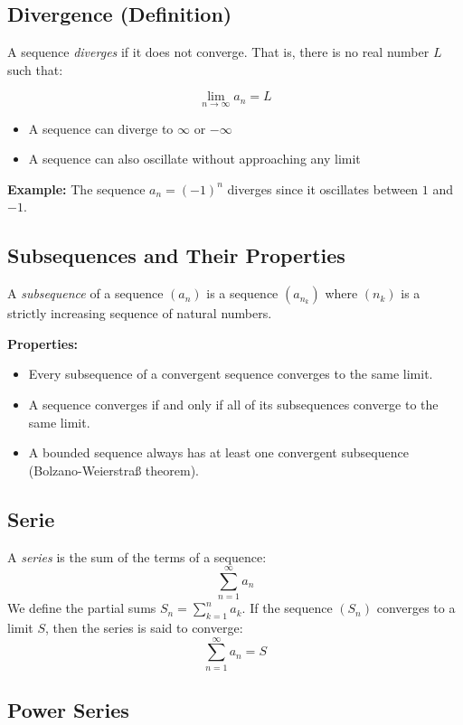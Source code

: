 \subsection{Divergence (Definition)}

A sequence \emph{diverges} if it does not converge. That is, there is no real number \(L\) such that:

\[
\lim_{n \to \infty} a_n = L
\]

\begin{itemize}[label=\(-\)]
\item A sequence can diverge to \(\infty\) or \(-\infty\)
\item A sequence can also oscillate without approaching any limit
\end{itemize}

\textbf{Example:} The sequence \(a_n = (-1)^n\) diverges since it oscillates between \(1\) and \(-1\).


\subsection{Subsequences and Their Properties}

A \emph{subsequence} of a sequence \((a_n)\) is a sequence \((a_{n_k})\) where \((n_k)\) is a strictly increasing sequence of natural numbers.

\textbf{Properties:}
\begin{itemize}[label=\(-\)]
\item Every subsequence of a convergent sequence converges to the same limit.
\item A sequence converges if and only if all of its subsequences converge to the same limit.
\item A bounded sequence always has at least one convergent subsequence (Bolzano-Weierstraß theorem).
\end{itemize}

\subsection{Serie}

A \emph{series} is the sum of the terms of a sequence:
\[
\sum_{n=1}^{\infty} a_n
\]
We define the partial sums \(S_n = \sum_{k=1}^n a_k\). If the sequence \((S_n)\) converges to a limit \(S\), then the series is said to converge:
\[
\sum_{n=1}^{\infty} a_n = S
\]

\subsection{Power Series}

